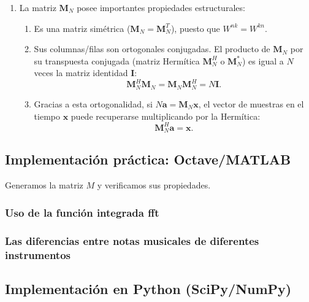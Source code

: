 \begin{enumerate}
	\item La matriz $\mathbf{M}_N$ posee importantes propiedades estructurales:
	\begin{enumerate}
		\item Es una matriz simétrica ($\mathbf{M}_N = \mathbf{M}_N^T$), puesto que $W^{nk} = W^{kn}$.
		\item Sus columnas/filas son ortogonales conjugadas. El producto de $\mathbf{M}_N$ por su transpuesta conjugada (matriz Hermítica $\mathbf{M}_N^H$ o $\mathbf{M}_N^*$) es igual a $N$ veces la matriz identidad $\mathbf{I}$:
		\begin{equation}
			\mathbf{M}_{N}^H \mathbf{M}_{N} = \mathbf{M}_{N} \mathbf{M}_{N}^H = N \mathbf{I}.
		\end{equation}
		\item Gracias a esta ortogonalidad, si $N \mathbf{a} = \mathbf{M}_N \mathbf{x}$, el vector de muestras en el tiempo $\mathbf{x}$ puede recuperarse multiplicando por la Hermítica:
		\begin{equation}
			\mathbf{M}_{N}^H \mathbf{a} = \mathbf{x}.
		\end{equation}
	\end{enumerate}
\end{enumerate}

\subsection{Implementación práctica: Octave/MATLAB}

Generamos la matriz $M$ y verificamos sus propiedades.


\subsubsection{Uso de la función integrada fft}




\subsubsection{Las diferencias entre notas musicales de diferentes instrumentos}


\subsection{Implementación en Python (SciPy/NumPy)}

